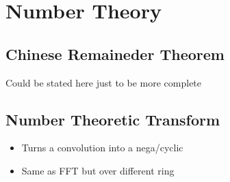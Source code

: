 \chapter{Number Theory}

\section{Chinese Remaineder Theorem}
Could be stated here just to be more complete

\section{Number Theoretic Transform}
\begin{itemize}
    \item Turns a convolution into a nega/cyclic 
    \item Same as FFT but over different ring
\end{itemize}